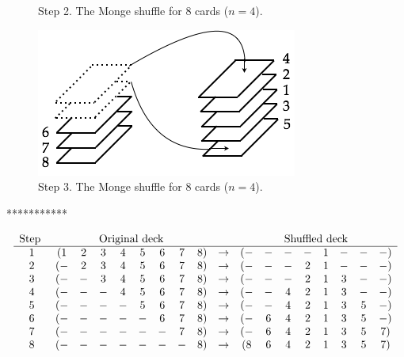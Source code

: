 \begin{enumerate}
\begin{enumerate}
{\begin{figure}[h]
\begin{center}
        \caption{Step 2. The Monge shuffle for $8$ cards ($n=4$).}
        \label{fig:suffleMonge2}
\end{center}
\end{figure}
\begin{figure}[h]
\begin{center}
        \includegraphics[scale=0.4]{FiguresArithmetic/suffleMongeStep3}
        \caption{Step 3. The Monge shuffle for $8$ cards ($n=4$).}
        \label{fig:suffleMonge3}
\end{center}
\end{figure}
***********}

\[ \begin{array}{cccccccccccccccccc}
\mbox{Step } & \multicolumn{8}{c}{\mbox{Original deck}} & &
     \multicolumn{8}{c}{\mbox{Shuffled deck}} \\
\hline
1 & (1 & 2 & 3 & 4 & 5 & 6 & 7 & 8) & \rightarrow & ( - & - & - & - & 1 & - &  - & - ) \\
2 & ( - & 2 & 3 & 4 & 5 & 6 & 7 & 8) & \rightarrow & ( - & - & - & 2 & 1 & - & - & - ) \\
3 & ( - & - & 3 & 4 & 5 & 6 & 7 & 8) &  \rightarrow& ( - & - & - & 2 & 1 & 3 & - & - ) \\
4 & ( - & - & - & 4 & 5 & 6 & 7 & 8) &  \rightarrow& ( - & - & 4 & 2 & 1 & 3 & - & - ) \\
5 & ( - & - & - & - & 5 & 6 & 7 & 8) &  \rightarrow& ( - & - & 4 & 2 & 1 & 3 & 5 & - ) \\
6 & ( - & - & - & - & - & 6 & 7 & 8) &  \rightarrow& ( - & 6 & 4 & 2 & 1 & 3 & 5 & - ) \\
7 & ( - & - & - & - & - & - & 7 & 8) &  \rightarrow& ( - & 6 & 4 & 2 & 1 & 3 & 5 & 7 ) \\
8 & ( - & - & - & - & - & - & - & 8) &  \rightarrow& ( 8 & 6 & 4 & 2 & 1 & 3 & 5 & 7 ) \\
\end{array}
\]


\end{enumerate}
\end{enumerate}
